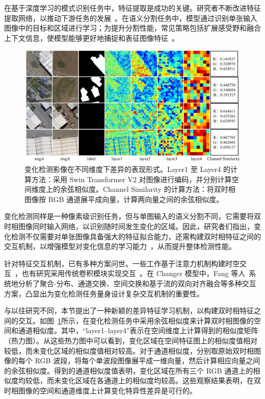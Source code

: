 在基于深度学习的模式识别任务中，特征提取是成功的关键。研究者不断改进特征提取网络，以推动下游任务的发展~\cite{He2015DeepRL, Dosovitskiy2020AnII, Liu2021SwinTH}。在语义分割任务中，模型通过识别单张输入图像中的目标和区域进行学习；为提升分割性能，常见策略包括扩展感受野和融合上下文信息，使模型能够更好地捕捉和表征图像特征~\cite{chen2018encoder, Wang2024PyramidMambaRP}。

\begin{figure}[!htb]
  \centering
  \includegraphics[width=\textwidth]{paper_figures/基于双时相遥感影像特征交互的变化检测算法研究/LENet/lenet_similarity.png}
  \caption{变化检测影像在不同维度下差异的表现形式。Layer1 至 Layer4 的计算方法：采用 Swin Transformer V2 对图像进行编码，并分别计算空间维度上的余弦相似度。Channel Similarity 的计算方法：将双时相图像按 RGB 通道展平成向量，计算两向量之间的余弦相似度。}
  \label{fig:lenet_similarity}
\end{figure}

变化检测同样是一种像素级识别任务，但与单图输入的语义分割不同，它需要将双时相图像同时输入网络，以识别随时间发生变化的区域。因此，研究者们指出，变化检测不仅需要对单张图像具备强大的特征拟合能力，还需构建双时相特征之间的交互机制，以增强模型对变化信息的学习能力~\cite{dong_changeclip_2024, Noman2023RemoteSC, zhao_exchanging_2023}，从而提升整体检测性能。

针对特征交互机制，已有多种方案问世。一些工作基于注意力机制构建时空交互~\cite{Peng2024FDAFFNetAF, Dong2024ISANetAI}，也有研究采用传统卷积模块实现交互~\cite{b_huang_remote-sensing_2024, Zhang2020ADS}。在 Changer 模型中，Fang 等人~\cite{Fang2022ChangerFI}系统地分析了聚合-分布、通道交换、空间交换和基于流的双向对齐融合等多种交互方案，凸显出为变化检测任务量身设计复杂交互机制的重要性。

与以往研究不同，本节提出了一种新颖的差异特征学习机制，以构建双时相特征之间的交互。如图~\ref{fig:lenet_similarity}所示，在变化检测任务中采用余弦相似度来计算双时相图像的空间和通道相似度。其中，“layer1–layer4”表示在空间维度上计算得到的相似度矩阵（热力图）。从这些热力图中可以看到，变化区域在空间特征图上的相似度值相对较低，而未变化区域的相似度值相对较高。对于通道相似度，分别取原始双时相图像的每个 RGB 波段，将每个单波段图像展平成一维向量，然后计算相应向量之间的余弦相似度。得到的通道相似度值表明，变化区域在所有三个 RGB 通道上的相似度均较低，而未变化区域在各通道上的相似度均较高。这些观察结果表明，在双时相图像的空间和通道维度上计算变化特异性差异是可行的。

